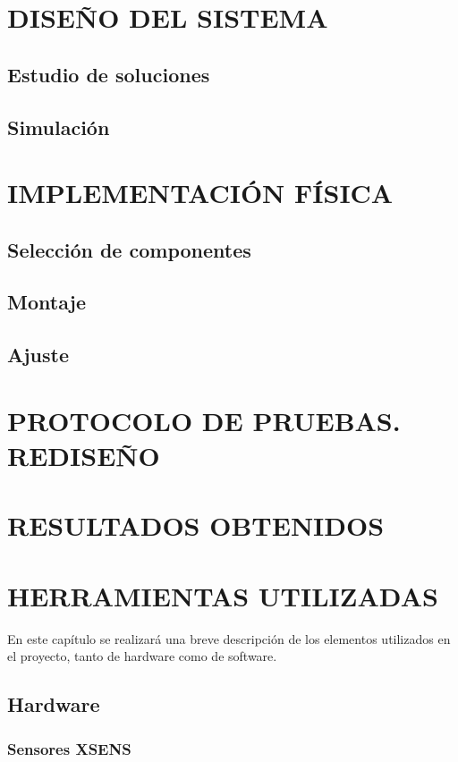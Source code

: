 \documentclass[10pt, a4paper]{report}
\begin{document}
\chapter{DISEÑO DEL SISTEMA}

\section{Estudio de soluciones}
\section{Simulación}

\chapter{IMPLEMENTACIÓN FÍSICA}
\section{Selección de componentes}
\section{Montaje}
\section{Ajuste}

\chapter{PROTOCOLO DE PRUEBAS. REDISEÑO}

\chapter{RESULTADOS OBTENIDOS}
\chapter{HERRAMIENTAS UTILIZADAS}

En este capítulo se realizará una breve descripción de los elementos utilizados en el proyecto, tanto de hardware como de software.

\section{Hardware}

\subsection{Sensores XSENS}
\end{document}
